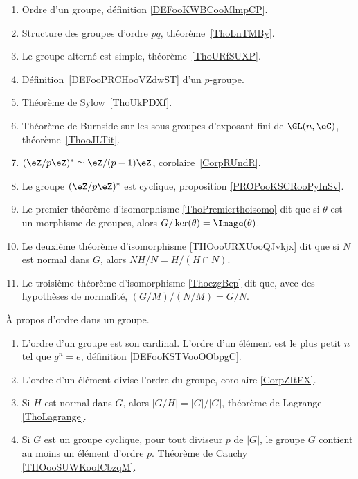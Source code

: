	\label{THEMEooTheorieGroupes}
\begin{enumerate}
	\item Ordre d'un groupe, définition \ref{DEFooKWBCooMlmpCP}.
	\item Structure des groupes d'ordre \( pq\), théorème~\ref{ThoLnTMBy}.
	\item Le groupe alterné est simple, théorème~\ref{ThoURfSUXP}.
	\item Définition~\ref{DEFooPRCHooVZdwST} d'un \( p\)-groupe.
	\item Théorème de Sylow~\ref{ThoUkPDXf}.
	\item Théorème de Burnside sur les sous-groupes d'exposant fini de \( \GL(n,\eC)\), théorème~\ref{ThooJLTit}.
	\item \( (\eZ/p\eZ)^*\simeq \eZ/(p-1)\eZ\), corolaire~\ref{CorpRUndR}.
	\item
	      Le groupe \( (\eZ/p\eZ)^*\) est cyclique, proposition \ref{PROPooKSCRooPyInSv}.
	\item Le premier théorème d'isomorphisme \ref{ThoPremierthoisomo} dit que si \( \theta\) est un morphisme de groupes, alors  \( G/\ker(\theta)=\Image(\theta)\).
	\item Le deuxième théorème d'isomorphisme \ref{THOooURXUooQJvkjx} dit que si \( N\) est normal dans \( G\), alors \( NH/N=H/(H\cap N)\).
	\item Le troisième théorème d'isomorphisme \ref{ThoezgBep} dit que, avec des hypothèses de normalité, \( (G/M)/(N/M)=G/N\).
\end{enumerate}

À propos d'ordre dans un groupe.
\begin{enumerate}
	\item
	      L'ordre d'un groupe est son cardinal. L'ordre d'un élément est le plus petit \( n\) tel que \( g^n=e\), définition \ref{DEFooKSTVooOObpgC}.
	\item
	      L'ordre d'un élément divise l'ordre du groupe, corolaire \ref{CorpZItFX}.
	\item
	      Si \( H\) est normal dans \( G\), alors \( | G/H |=| G |/| G |\), théorème de Lagrange \ref{ThoLagrange}.
	\item
	      Si \( G\) est un groupe cyclique, pour tout diviseur \( p\) de \( | G |\), le groupe \( G\) contient au moins un élément d'ordre \( p\). Théorème de Cauchy \ref{THOooSUWKooICbzqM}.
\end{enumerate}
